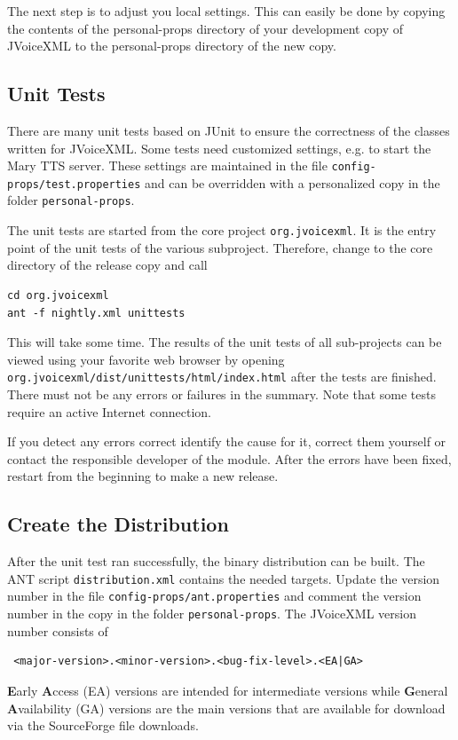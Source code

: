 \documentclass[11pt,a4paper]{article}
\begin{document}
The next step is to adjust you local settings. This can easily be done by
copying the contents of the personal-props directory of your development copy
of JVoiceXML to the personal-props directory of the new copy.


\subsection{Unit Tests}

There are many unit tests based on JUnit to ensure the correctness of the
classes written for JVoiceXML. Some tests need customized settings, e.g. to
start the Mary TTS server. These settings are maintained in the file
\texttt{config-props/test.properties} and can be overridden with a
personalized copy in the folder \texttt{personal-props}.

The unit tests are started from the core project
\texttt{org.jvoicexml}. It is the entry point of the unit tests of the various subproject. Therefore, change to the core directory of the release copy and call
\begin{lstlisting}
cd org.jvoicexml
ant -f nightly.xml unittests
\end{lstlisting}
This will take some time. The results of the unit tests of all sub-projects can
be viewed using your favorite web browser by opening
\texttt{org.jvoicexml/dist/unittests/html/index.html} after the tests are
finished. There must not be any errors or failures in the summary. Note that
some tests require an active Internet connection. 

If you detect any errors correct identify the cause for it, correct them
yourself or contact the responsible developer of the module. After the errors
have been fixed, restart from the beginning to make a new release.

\subsection{Create the Distribution}

After the unit test ran successfully, the binary distribution can be built. The
ANT script \texttt{distribution.xml} contains the needed targets.
Update the version number in the file \texttt{config-props/ant.properties}
and comment the version number in the copy in the folder
\texttt{personal-props}. The JVoiceXML version number consists of
\begin{lstlisting}
 <major-version>.<minor-version>.<bug-fix-level>.<EA|GA>
\end{lstlisting}
\textbf{E}arly \textbf{A}ccess (EA) versions are intended for intermediate
versions while \textbf{G}eneral \textbf{A}vailability (GA) versions are the
main versions that are available for download via the SourceForge file
downloads.
\end{document}
